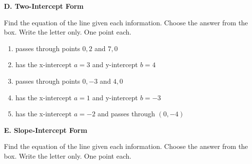     \noindent \textbf{D. Two-Intercept Form} 
    
    Find the equation of the line given each information. Choose the answer from the box. Write the letter only. One point each.
    
    \begin{center}  
    \end{center}
    
    \begin{enumerate}[resume]
    		\item  passes through points $ 0, 2 $ and $ 7, 0 $ %
    		\item  has the x-intercept $ a = 3 $ and y-intercept $ b = 4 $ %
    		\item passes through points $ 0, -3 $ and $ 4, 0 $	%
    		\item  has the x-intercept $ a = 1 $ and y-intercept $ b = -3 $ %
    		\item  has the x-intercept $ a = -2 $ and passes through $ (0, -4) $ %
    \end{enumerate}
    
    \vspace*{1.3ex}

\noindent \textbf{E. Slope-Intercept Form} 

Find the equation of the line given each information. Choose the answer from the box. Write the letter only. One point each.

\begin{center}  
\end{center}

